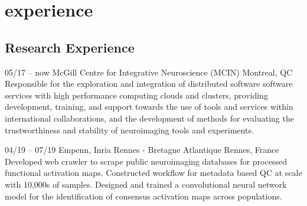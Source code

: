 \documentclass[]{friggeri-cv} %
\begin{document}

\section{experience}

\subsection{Research Experience}

\begin{entrylist}
\entry
{05/17 -- now}
{McGill Centre for Integrative Neuroscience (MCIN)}
{Montreal, QC}
{ \\
Responsible for the exploration and integration of distributed software software services with high
performance computing clouds and clusters, providing development, training, and support towards the
use of tools and services within international collaborations, and the development of methods for
evaluating the trustworthiness and stability of neuroimaging tools and experiments.}

\entry
{04/19 -- 07/19}
{Empenn, Inria Rennes - Bretagne Atlantique}
{Rennes, France}
{\\
Developed web crawler to scrape public neuroimaging databases for processed functional activation maps. Constructed
workflow for metadata based QC at scale with 10,000s of samples. Designed and trained a convolutional neural network
model for the identification of consensus activation maps across populations.}
\end{entrylist}


\end{document}
